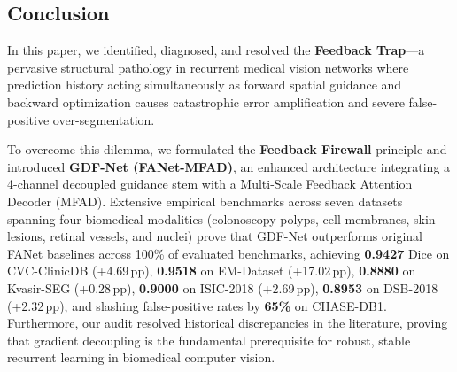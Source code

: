 \subsection{Conclusion}
In this paper, we identified, diagnosed, and resolved the \textbf{Feedback Trap}---a pervasive structural pathology in recurrent medical vision networks where prediction history acting simultaneously as forward spatial guidance and backward optimization causes catastrophic error amplification and severe false-positive over-segmentation.

To overcome this dilemma, we formulated the \textbf{Feedback Firewall} principle and introduced \textbf{GDF-Net (FANet-MFAD)}, an enhanced architecture integrating a 4-channel decoupled guidance stem with a Multi-Scale Feedback Attention Decoder (MFAD). Extensive empirical benchmarks across seven datasets spanning four biomedical modalities (colonoscopy polyps, cell membranes, skin lesions, retinal vessels, and nuclei) prove that GDF-Net outperforms original FANet baselines across 100\% of evaluated benchmarks, achieving \textbf{0.9427} Dice on CVC-ClinicDB (+4.69\,pp), \textbf{0.9518} on EM-Dataset (+17.02\,pp), \textbf{0.8880} on Kvasir-SEG (+0.28\,pp), \textbf{0.9000} on ISIC-2018 (+2.69\,pp), \textbf{0.8953} on DSB-2018 (+2.32\,pp), and slashing false-positive rates by \textbf{65\%} on CHASE-DB1. Furthermore, our audit resolved historical discrepancies in the literature, proving that gradient decoupling is the fundamental prerequisite for robust, stable recurrent learning in biomedical computer vision.
